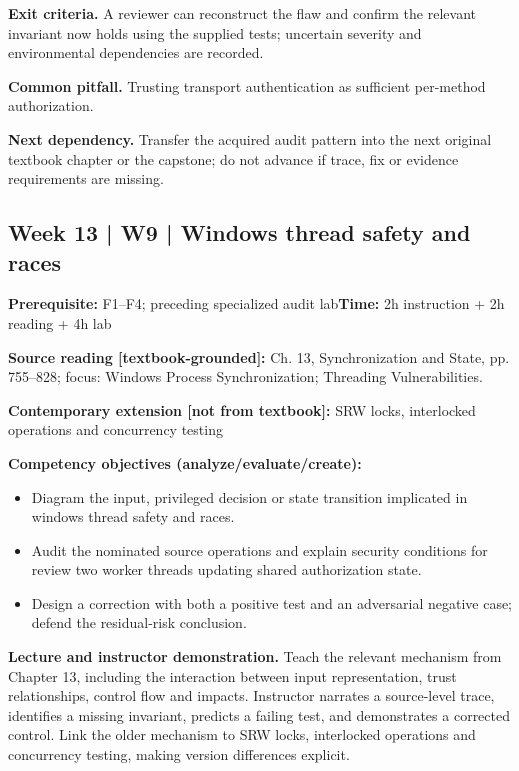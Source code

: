 \documentclass[10pt,letterpaper]{article}
\begin{document}
\textbf{Exit criteria.} A reviewer can reconstruct the flaw and confirm the relevant invariant now holds using the supplied tests; uncertain severity and environmental dependencies are recorded.

\textbf{Common pitfall.} Trusting transport authentication as sufficient per-method authorization.

\textbf{Next dependency.} Transfer the acquired audit pattern into the next original textbook chapter or the capstone; do not advance if trace, fix or evidence requirements are missing.

\subsection{Week 13 | W9 | Windows thread safety and races}
\textbf{Prerequisite:} F1--F4; preceding specialized audit lab\hfill\textbf{Time:} 2h instruction + 2h reading + 4h lab

\textbf{Source reading [textbook-grounded]:} Ch. 13, Synchronization and State, pp. 755--828; focus: Windows Process Synchronization; Threading Vulnerabilities.

\textbf{Contemporary extension [not from textbook]:} SRW locks, interlocked operations and concurrency testing

\textbf{Competency objectives (analyze/evaluate/create):}
\begin{itemize}[leftmargin=*,itemsep=2pt]
\item Diagram the input, privileged decision or state transition implicated in windows thread safety and races.
\item Audit the nominated source operations and explain security conditions for review two worker threads updating shared authorization state.
\item Design a correction with both a positive test and an adversarial negative case; defend the residual-risk conclusion.
\end{itemize}
\textbf{Lecture and instructor demonstration.} Teach the relevant mechanism from Chapter 13, including the interaction between input representation, trust relationships, control flow and impacts. Instructor narrates a source-level trace, identifies a missing invariant, predicts a failing test, and demonstrates a corrected control. Link the older mechanism to SRW locks, interlocked operations and concurrency testing, making version differences explicit.
\end{document}
